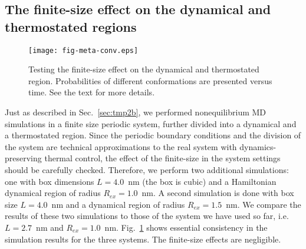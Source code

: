 \documentclass[a4paper,preprint,unsortedaddress,onecolumn]{revtex4-1}
\begin{document}
\subsection{The finite-size effect on the dynamical and thermostated regions}

\begin{figure}
  \centering
  \texttt{[image: fig-meta-conv.eps]}
  \caption{Testing the finite-size effect on the dynamical and thermostated region.
    Probabilities of different conformations are presented versus time.
    See the text for more details.
  }
  \label{fig:tmp7}
\end{figure}

Just as described in Sec.~\ref{sec:tmp2b}, we performed nonequilibrium MD
simulations in a finite size periodic system, further divided 
into a dynamical and a thermostated region.
Since the periodic boundary conditions and the division of the system
are technical approximations to the real system with dynamics-preserving thermal control, 
the effect of the finite-size in 
the system settings should be carefully checked.
Therefore, we
perform two additional simulations: one with box dimensions
$L=4.0$~nm (the box is cubic) and a
Hamiltonian dynamical region of radius $R_{ex} = 1.0$~nm. A second simulation is done with box size $L=4.0$~nm and a dynamical region of
radius $R_{ex} = 1.5$~nm. We compare the results of these two simulations to those of the system we have used so far, i.e. $L=2.7$~nm and $R_{ex} = 1.0$~nm.
Fig.~\ref{fig:tmp7} shows essential consistency in
the simulation results for the three systems. The finite-size effects are
negligible.
\end{document}
